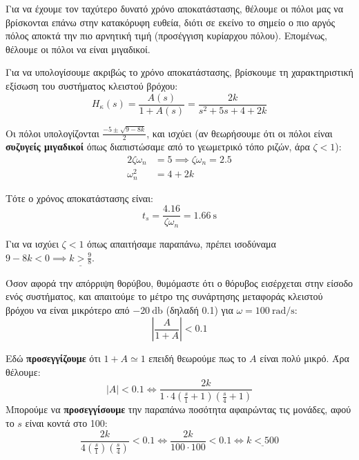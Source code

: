\documentclass[11pt,a4paper,notitlepage,fleqn,final]{article}
\begin{document}
\begin{exercise}

Για να έχουμε τον ταχύτερο δυνατό χρόνο αποκατάστασης, θέλουμε οι πόλοι μας να βρίσκονται
επάνω στην κατακόρυφη ευθεία, διότι σε εκείνο το σημείο ο πιο αργός πόλος αποκτά την
πιο αρνητική τιμή (προσέγγιση κυρίαρχου πόλου). Επομένως, θέλουμε οι πόλοι να είναι μιγαδικοί.

Για να υπολογίσουμε ακριβώς το χρόνο αποκατάστασης, βρίσκουμε τη χαρακτηριστική εξίσωση
του συστήματος κλειστού βρόχου:
\[
H_\kappa(s) = \frac{A(s)}{1+A(s)} = \frac{2k}{s^2+5s+4+2k}
\]

Οι πόλοι υπολογίζονται \( \frac{-5\pm\sqrt{9-8k}}{2} \), και ισχύει (αν θεωρήσουμε ότι
οι πόλοι είναι \textbf{συζυγείς μιγαδικοί} όπως διαπιστώσαμε από το γεωμετρικό τόπο
ριζών, άρα \( ζ < 1 \)):
\begin{align*}
	2ζ\omega_ n &= 5 \implies ζ\omega_n = 2.5 \\
	\omega_n^2 &= 4+2k
\end{align*}

Τότε ο χρόνος αποκατάστασης είναι:
\[
t_s = \frac{4.16}{ζ\omega_n} = \SI{1.66}{\second}
\]

Για να ισχύει \( ζ<1 \) όπως απαιτήσαμε παραπάνω, πρέπει ισοδύναμα \( 9-8k < 0
\implies \underline{k>\frac{9}{8}} \).

Όσον αφορά την απόρριψη θορύβου, θυμόμαστε ότι ο θόρυβος εισέρχεται στην είσοδο ενός
συστήματος, και απαιτούμε το μέτρο της συνάρτησης μεταφοράς κλειστού βρόχου να είναι
μικρότερο από \( -\SI{20}{\decibel} \) (δηλαδή 0.1) για \( \omega = \SI{100}{\radian/\second} \):
\[
\left|\frac{A}{1+A}\right| < 0.1
\]

Εδώ \textbf{προσεγγίζουμε} ότι \( 1+A \simeq 1 \) επειδή θεωρούμε πως το \( A \) είναι πολύ
μικρό. Άρα θέλουμε:
\[
|A| < 0.1 \iff \frac{2k}{1\cdot 4 \left(\frac{s}{1}+1\right)\left(\frac{s}{4}+1\right)}
\]
Μπορούμε να \textbf{προσεγγίσουμε} την παραπάνω ποσότητα αφαιρώντας τις μονάδες, αφού το
\( s \) είναι κοντά στο 100:
\[
\frac{2k}{4\left(\frac{s}{1}\right)\left(\frac{s}{4}\right)}
< 0.1
\iff \frac{2k}{100\cdot 100} < 0.1
\iff \underline{k < 500}
\]


\end{exercise}
\end{document}
